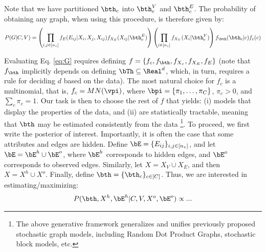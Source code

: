 % 
% 
Note that we have partitioned $\bth_c$ into $\bth_c^V$ and $\bth_c^E$. The probability of obtaining any graph, when using this procedure, is therefore given by:
\begin{align}
	\label{eq:G} P(G | C,V) = \left(\prod_{i,j \in [n_v]} f_E(E_{ij} | X_i, X_j, X_{ij}) f_{X_E}(X_{ij} | \bth_c^E) \right) \left(\prod_{i \in [n_v]} f_{X_V}(X_i | \bth_c^V) \right) f_{\bth}(\bth_c | c) f_c(c) 
\end{align}

Evaluating Eq. \ref{eq:G} requires defining $f=\{f_c, f_{\bth}, f_{X_v}, f_{X_E}, f_E\}$ (note that $f_{\bth}$ implicitly depends on defining $\bTh \subseteq \Real^d$, which, in turn, requires a rule for deciding $d$ based on the data). The most natural choice for $f_c$ is a multinomial, that is, $f_c = MN(\vpi)$, where $\bpi = \{\pi_1, \ldots, \pi_C\}$, $\pi_c>0$, and $\sum_c \pi_c = 1$. Our task is then to choose the rest of $f$ that yields: (i) models that display the properties of the data, and (ii) are statistically tractable, meaning that $\bth$ may be estimated consistently from the data \footnote{The above generative framework generalizes and unifies previously proposed stochastic graph models, including Random Dot Product Graphs, stochastic block models, etc.}. To proceed, we first write the posterior of interest. Importantly, it is often the case that some attributes and edges are hidden. Define $\bE=\{E_{ij}\}_{i,j \in [n_v]}$, and let $\bE = \bE^h \cup \bE^o$, where $\bE^h$ corresponds to hidden edges, and $\bE^o$ corresponds to observed edges. Similarly, let $X = X_V \cup X_E$, and then $X= X^h \cup X^o$. Finally, define $\bth=\{\bth_c\}_{c \in [C]}$. Thus, we are interested in estimating/maximizing:
\begin{align}
	\label{eq:post} P(\bth, X^h, \bE^h | C, V, X^o, \bE^o) \propto ... 
\end{align}

